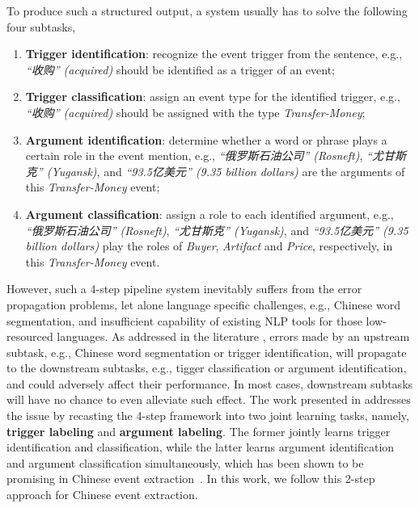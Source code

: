 To produce such a structured output, a system usually has to solve the following four subtasks,
\begin{enumerate}
	\item \textbf{Trigger identification}: recognize the event trigger from the sentence, e.g., \textit{``收购'' (acquired)} should be identified as a trigger of an event;
	\item \textbf{Trigger classification}: assign an event type for the identified trigger, e.g., \textit{``收购'' (acquired)} should be assigned with the type \emph{Transfer-Money};
	\item \textbf{Argument identification}: determine whether a word or phrase plays a certain role in the event mention, e.g., \textit{``俄罗斯石油公司'' (Rosneft)}, \textit{``尤甘斯克'' (Yugansk)}, and \textit{``93.5亿美元'' (9.35 billion dollars)} are the arguments of this \emph{Transfer-Money} event;
	\item \textbf{Argument classification}: assign a role to each identified argument, e.g., \textit{``俄罗斯石油公司'' (Rosneft)}, \textit{``尤甘斯克'' (Yugansk)}, and \textit{``93.5亿美元'' (9.35 billion dollars)} play the roles of \emph{Buyer}, \emph{Artifact} and \emph{Price}, respectively, in this  \emph{Transfer-Money} event.
\end{enumerate}


However, such a 4-step pipeline system inevitably suffers from the error propagation problems, let alone language specific challenges,  e.g., Chinese word segmentation, and insufficient capability of existing NLP tools for those low-resourced languages.  As addressed in the literature \cite{chen2009language,li2012employing}, errors made by an upstream subtask, e.g., Chinese word segmentation or trigger identification,  will propagate to the downstream subtasks, e.g., tigger classification or argument identification, and could adversely affect their performance. In most cases, downstream subtasks will have no chance to even alleviate such effect. The work presented in \cite{chen2012joint} addresses the issue by recasting the 4-step framework  into two joint learning tasks, namely, \textbf{trigger labeling} and \textbf{argument labeling}. The  former jointly learns trigger identification and classification, while the latter learns argument identification and argument classification simultaneously, which has been shown to be promising in Chinese event extraction~\cite{chen2012joint}. In this work, we follow this 2-step approach for Chinese event extraction.


